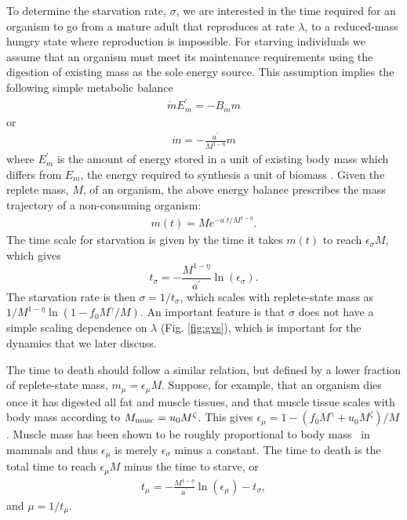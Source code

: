\documentclass[11pt]{article}
\begin{document}
\begin{multicols}{2}
To determine the starvation rate, $\sigma$, we are interested in the time
required for an organism to go from a mature adult that reproduces at rate
$\lambda$, to a
reduced-mass hungry state where reproduction is impossible.  For starving individuals we assume that an organism must meet its maintenance requirements using the digestion of existing mass as the sole energy source.
This assumption implies the following simple metabolic balance 
\begin{eqnarray}
\dot{m}E_{m}^{\prime}=-B_{m}m
\end{eqnarray}
or
\begin{eqnarray}
\dot{m}=-\frac{a^{\prime}}{M^{1-\eta}}m
\end{eqnarray}
where $E_{m}^{\prime}$ is the amount of energy stored in a unit of existing
body mass which differs from $E_{m}$, the energy required to
synthesis a unit of biomass \cite{hou}. Given the replete mass, $M$, of an organism, the
above energy balance prescribes the mass trajectory of a non-consuming
organism:
\begin{eqnarray}
\label{mt}
m\left(t\right)=Me^{-a^{\prime}t/M^{1-\eta}}.
\end{eqnarray}
The time scale for starvation is
given by the time it takes $m(t)$ to reach $\epsilon_{\sigma} M$, which gives
\begin{equation}
\label{eq:sigma}
t_{\sigma}=-\frac{M^{1-\eta}}{a^{\prime}}\ln\left(\epsilon_{\sigma}\right).
\end{equation}
The starvation rate is then $\sigma=1/t_{\sigma}$, which scales with
replete-state mass as $1/M^{1-\eta}\ln\left(1-f_{0}M^{\gamma}/M\right)$.  An important
feature is that $\sigma$ does not have a simple scaling dependence on
$\lambda$ (Fig. \ref{fig:gvs}), which is important for the dynamics that we
later discuss.

The time to death should follow a similar relation, but defined by a lower
fraction of replete-state mass, $m_{\mu}=\epsilon_{\mu} M$.
Suppose, for example, that an organism dies once it has digested all fat and
muscle tissues, and that muscle tissue scales with body mass according to
$M_{\rm musc}=u_{0}M^{\zeta}$.  This gives
$\epsilon_{\mu}=1-\left(f_{0}M^{\gamma}+u_{0}M^{\zeta}\right)/M$. Muscle
mass has been shown to be roughly proportional to body mass~\cite{Folland:2008ij} in
mammals and thus $\epsilon_{\mu}$ is merely $\epsilon_{\sigma}$ minus a constant. The time to death is the total time to reach $\epsilon_{\mu}M$ minus the time to starve, or
\begin{eqnarray}
t_{\mu}=-\frac{M^{1-\eta}}{a^{\prime}}\ln\left(\epsilon_{\mu}\right)-t_{\sigma},
\end{eqnarray}
and $\mu=1/t_{\mu}$. 



\end{multicols}
\end{document}
